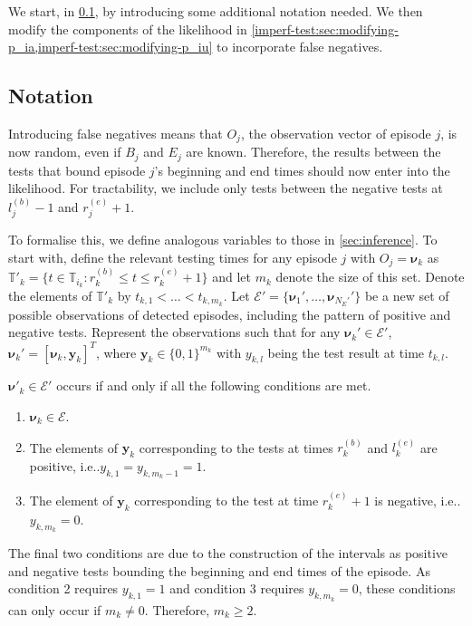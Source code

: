 \documentclass[12pt]{article}
\makeatletter
\newcommand\set{\mathcal}
\renewcommand{\vec}[1]{\bm{#1}}
\newcommand{\ssep}{:}
\newcommand{\sched}{\mathbb{T}}
\DeclareRobustCommand\onedot{\futurelet\@let@token\@onedot}
\def\@onedot{\ifx\@let@token.\else.\null\fi\xspace}
\def\ie{i.e\onedot} \def\Ie{{I.e}\onedot}
\makeatother
\begin{document}
We start, in \cref{imperf-test:sec:notation}, by introducing some additional notation needed.
We then modify the components of the likelihood in \cref{imperf-test:sec:modifying-p_ia,imperf-test:sec:modifying-p_iu} to incorporate false negatives.


\subsection{Notation} \label{imperf-test:sec:notation}

Introducing false negatives means that $O_j$, the observation vector of episode $j$, is now random, even if $B_j$ and $E_j$ are known.
Therefore, the results between the tests that bound episode $j$'s beginning and end times should now enter into the likelihood.
For tractability, we include only tests between the negative tests at $l_j^{(b)}-1$ and $r_j^{(e)}+1$. 

To formalise this, we define analogous variables to those in \cref{sec:inference}.
To start with, define the relevant testing times for any episode $j$ with $O_j = \vec{\nu}_k$ as $\sched'_k = \{ t \in \sched_{i_k} \ssep r_k^{(b)} \leq t \leq r_k^{(e)} + 1 \}$ and let $m_k$ denote the size of this set.
Denote the elements of $\sched'_k$ by $t_{k,1} < \dots < t_{k,m_k}$.
Let $\set{E}' = \{ \vec{\nu}_1', \dots, \vec{\nu}_{N_E'}' \}$ be a new set of possible observations of detected episodes, including the pattern of positive and negative tests.
Represent the observations such that for any $\vec{\nu}_k' \in \set{E}'$, $\vec{\nu}_k' = [\vec{\nu}_{k}, \vec{y}_k]^T$, where $\vec{y}_k \in \{ 0, 1 \}^{m_k}$ with $y_{k,l}$ being the test result at time $t_{k,l}$.

$\vec{\nu}'_k \in \set{E}'$ occurs if and only if all the following conditions are met.
\begin{enumerate}
  \item $\vec{\nu}_k \in \set{E}$.
  \item The elements of $\vec{y}_k$ corresponding to the tests at times $r_k^{(b)}$ and $l_k^{(e)}$ are positive, \ie $y_{k,1} = y_{k,m_k-1} = 1$.
  \item The element of $\vec{y}_k$ corresponding to the test at time $r_k^{(e)} + 1$ is negative, \ie $y_{k,m_k} = 0$.
\end{enumerate}
The final two conditions are due to the construction of the intervals as positive and negative tests bounding the beginning and end times of the episode.
As condition 2 requires $y_{k,1} = 1$ and condition 3 requires $y_{k,m_k} = 0$, these conditions can only occur if $m_k \neq 0$.
Therefore, $m_k \geq 2$.
\end{document}
